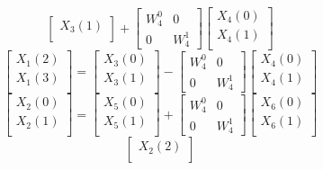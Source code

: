 \documentclass[journal,12pt,twocolumn]{IEEEtran}
\renewcommand\thesection{\arabic{section}}
\begin{document}
\begin{enumerate}[label=\arabic*.,ref=\thesection.\theenumi]
\begin{equation}
\begin{bmatrix}
X_{3}(1)\\ 
\end{bmatrix}
+
\begin{bmatrix}
W^{0}_{4} & 0\\
0 & W^{1}_{4}
\end{bmatrix}
\begin{bmatrix}
X_{4}(0) \\ 
X_{4}(1) \\ 
\end{bmatrix}
\end{equation}
\begin{equation}
\begin{bmatrix}
X_{1}(2) \\ 
X_{1}(3)\\ 
\end{bmatrix}
=
\begin{bmatrix}
X_{3}(0) \\ 
X_{3}(1)\\ 
\end{bmatrix}
-
\begin{bmatrix}
W^{0}_{4} & 0\\
0 & W^{1}_{4}
\end{bmatrix}
\begin{bmatrix}
X_{4}(0) \\ 
X_{4}(1) \\ 
\end{bmatrix}
\end{equation}
\begin{equation}
\begin{bmatrix}
X_{2}(0) \\ 
X_{2}(1)\\ 
\end{bmatrix}
=
\begin{bmatrix}
X_{5}(0) \\ 
X_{5}(1)\\ 
\end{bmatrix}
+
\begin{bmatrix}
W^{0}_{4} & 0\\
0 & W^{1}_{4}
\end{bmatrix}
\begin{bmatrix}
X_{6}(0) \\ 
X_{6}(1) \\ 
\end{bmatrix}
\end{equation}
\begin{equation}
\begin{bmatrix}
X_{2}(2) \\ 

\end{bmatrix}
\end{equation}
\end{enumerate}
\end{document}
